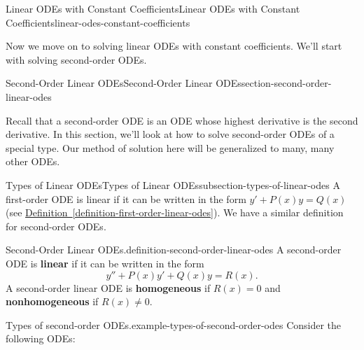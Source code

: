 \documentclass[oneside,10pt,]{book}
\newcommand{\terminology}[1]{\textbf{#1}}
\numberwithin{equation}{section}
\begin{document}
\begin{chapterptx}{Linear ODEs with Constant Coefficients}{}{Linear ODEs with Constant Coefficients}{}{}{linear-odes-constant-coefficients}
\begin{introduction}{}%
\hypertarget{p-143}{}%
Now we move on to solving linear ODEs with constant coefficients. We'll start with solving second-order ODEs.%
\end{introduction}%
%
%
\typeout{************************************************}
\typeout{************************************************}
%
\begin{sectionptx}{Second-Order Linear ODEs}{}{Second-Order Linear ODEs}{}{}{section-second-order-linear-odes}
\begin{introduction}{}%
\hypertarget{p-144}{}%
Recall that a second-order ODE is an ODE whose highest derivative is the second derivative. In this section, we'll look at how to solve second-order ODEs of a special type. Our method of solution here will be generalized to many, many other ODEs.%
\end{introduction}%
%
%
\typeout{************************************************}
\typeout{************************************************}
%
\begin{subsectionptx}{Types of Linear ODEs}{}{Types of Linear ODEs}{}{}{subsection-types-of-linear-odes}
\hypertarget{p-145}{}%
A first-order ODE is linear if it can be written in the form \(y'+P(x)y = Q(x)\) (see \hyperref[definition-first-order-linear-odes]{Definition~\ref{definition-first-order-linear-odes}}). We have a similar definition for second-order ODEs.%
\begin{definition}{Second-Order Linear ODEs.}{definition-second-order-linear-odes}%
\hypertarget{p-146}{}%
A second-order ODE is \terminology{linear} if it can be written in the form%
\begin{equation*}
y''+P(x)y'+Q(x)y = R(x).
\end{equation*}
A second-order linear ODE is \terminology{homogeneous} if \(R(x) = 0\) and \terminology{nonhomogeneous} if \(R(x)\neq0\).%
\end{definition}
\begin{example}{Types of second-order ODEs.}{example-types-of-second-order-odes}%
\hypertarget{p-147}{}%
Consider the following ODEs:\leavevmode%
\begin{enumerate}

\end{enumerate}
\end{example}
\end{subsectionptx}
\end{sectionptx}
\end{chapterptx}
\end{document}
